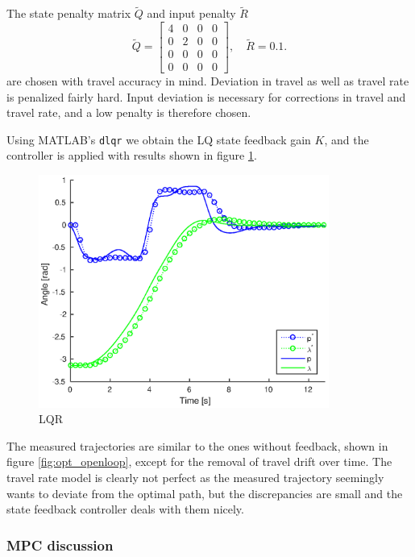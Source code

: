 The state penalty matrix $\tilde{Q}$ and input penalty $\tilde{R}$
\begin{equation*}
\tilde{Q} = \begin{bmatrix}4&0&0&0\\0&2&0&0\\0&0&0&0\\0&0&0&0\end{bmatrix}, \quad \tilde{R} = 0.1.
\end{equation*}
are chosen with travel accuracy in mind. Deviation in travel as well as travel rate is penalized fairly hard. Input deviation is necessary for corrections in travel and travel rate, and a low penalty is therefore chosen.

Using MATLAB's \texttt{dlqr} we obtain the LQ state feedback gain $K$, and the controller is applied with results shown in figure \ref{fig:lqr}.

\begin{figure}[hp]
	\centering
		\includegraphics[width=0.85\textwidth]{figures/3/closedloop.eps}
	\caption{LQR}
	\label{fig:lqr}
\end{figure}


The measured trajectories are similar to the ones without feedback, shown in figure \ref{fig:opt_openloop}, except for the removal of travel drift over time. The travel rate model is clearly not perfect as the measured trajectory seemingly wants to deviate from the optimal path, but the discrepancies are small and the state feedback controller deals with them nicely.


\subsubsection{MPC discussion}

